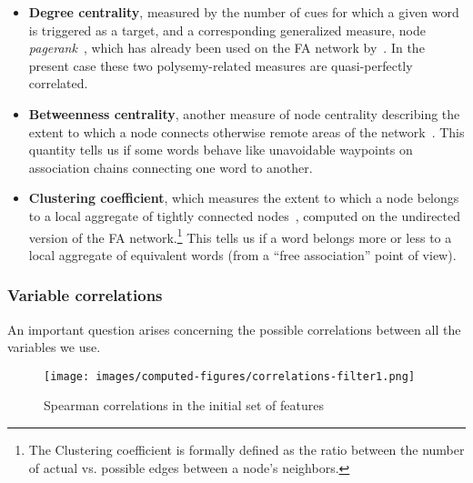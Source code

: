 \begin{itemize}
    \item \textbf{Degree centrality}, measured by the number of cues for which a given word is triggered as a target, and a corresponding generalized measure, node \emph{pagerank}~\citep{Page99}, which has already been used on the FA network by~\citet{Griffiths07}.
    In the present case these two polysemy-related measures are quasi-perfectly correlated. %
    \item \textbf{Betweenness centrality}, another measure of node centrality describing the extent to which a node connects otherwise remote areas of the network~\citep{free:set}.
    This quantity tells us if some words behave like unavoidable waypoints on association chains connecting one word to another.
    \item \textbf{Clustering coefficient}, which measures the extent to which a node belongs to a local aggregate of tightly connected nodes~\cite{watt-coll}, computed on the undirected version of the FA network.\footnote{The Clustering coefficient is formally defined as the ratio between the number of actual vs. possible edges between a node's neighbors.}
    This tells us if a word belongs more or less to a local aggregate of equivalent words (from a ``free association'' point of view).
\end{itemize}

\subsubsection{Variable correlations}

An important question arises concerning the possible correlations between all the variables we use.

\begin{figure}[!th]
    \centering
    \texttt{[image: images/computed-figures/correlations-filter1.png]}
    \caption{Spearman correlations in the initial set of features}
    \label{fig:feature-corrs-initial}
\end{figure}

